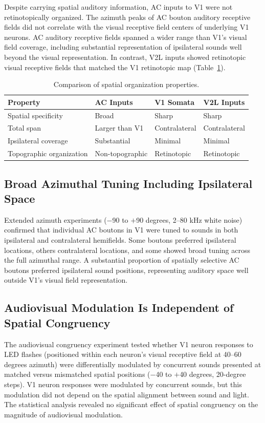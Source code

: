\documentclass[11pt]{article}
\begin{document}
Despite carrying spatial auditory information, AC inputs to V1 were not retinotopically organized. The azimuth peaks of AC bouton auditory receptive fields did not correlate with the visual receptive field centers of underlying V1 neurons. AC auditory receptive fields spanned a wider range than V1's visual field coverage, including substantial representation of ipsilateral sounds well beyond the visual representation. In contrast, V2L inputs showed retinotopic visual receptive fields that matched the V1 retinotopic map (Table~\ref{tab:organization}).

\begin{table}[htbp]
\centering
\caption{Comparison of spatial organization properties.}
\label{tab:organization}
\begin{tabular}{llll}
\toprule
Property & AC Inputs & V1 Somata & V2L Inputs \\
\midrule
Spatial specificity & Broad & Sharp & Sharp \\
Total span & Larger than V1 & Contralateral & Contralateral \\
Ipsilateral coverage & Substantial & Minimal & Minimal \\
Topographic organization & Non-topographic & Retinotopic & Retinotopic \\
\bottomrule
\end{tabular}
\end{table}

\subsection{Broad Azimuthal Tuning Including Ipsilateral Space}

Extended azimuth experiments ($-$90 to $+$90 degrees, 2--80 kHz white noise) confirmed that individual AC boutons in V1 were tuned to sounds in both ipsilateral and contralateral hemifields. Some boutons preferred ipsilateral locations, others contralateral locations, and some showed broad tuning across the full azimuthal range. A substantial proportion of spatially selective AC boutons preferred ipsilateral sound positions, representing auditory space well outside V1's visual field representation.

\subsection{Audiovisual Modulation Is Independent of Spatial Congruency}

The audiovisual congruency experiment tested whether V1 neuron responses to LED flashes (positioned within each neuron's visual receptive field at 40--60 degrees azimuth) were differentially modulated by concurrent sounds presented at matched versus mismatched spatial positions ($-$40 to $+$40 degrees, 20-degree steps). V1 neuron responses were modulated by concurrent sounds, but this modulation did not depend on the spatial alignment between sound and light. The statistical analysis revealed no significant effect of spatial congruency on the magnitude of audiovisual modulation.
\end{document}
